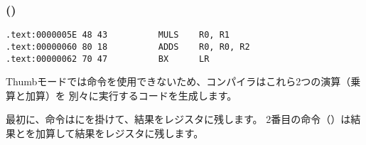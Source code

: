 \subsubsection{\OptimizingKeilVI (\ThumbMode)}

\begin{lstlisting}[label=ARM_leaf_example2,style=customasmARM]
.text:0000005E 48 43          MULS    R0, R1
.text:00000060 80 18          ADDS    R0, R0, R2
.text:00000062 70 47          BX      LR
\end{lstlisting}

Thumbモードでは命令を使用できないため、コンパイラはこれら2つの演算（乗算と加算）を
別々に実行するコードを生成します。

最初に、命令はにを掛けて、結果をレジスタに残します。 
2番目の命令（）は結果とを加算して結果をレジスタに残します。
